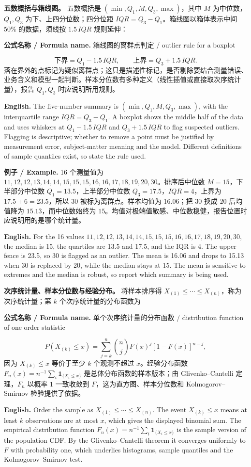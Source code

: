 \documentclass[UTF8,11pt,a4paper]{ctexart}
\newcommand{\EN}[1]{\par\noindent\textbf{English.} #1\par}
\newcommand{\FORMULA}[2]{\par\noindent\textbf{公式名称 / Formula name.} #1 / #2\par}
\newcommand{\EX}[2]{\par\noindent\textbf{例子 / Example.} #1\par\EN{#2}}
\begin{document}
\noindent\textbf{五数概括与箱线图。} 五数概括是 $(\min,Q_1,M,Q_3,\max)$，其中 $M$ 为中位数，$Q_1,Q_3$ 为下、上四分位数；四分位距 $IQR=Q_3-Q_1$。箱线图以箱体表示中间 $50\%$ 的数据，须线按 $1.5\,IQR$ 规则延伸：
\FORMULA{箱线图的离群点判定}{outlier rule for a boxplot}
\[
\text{下界}=Q_1-1.5\,IQR,\qquad \text{上界}=Q_3+1.5\,IQR.
\]
落在界外的点标记为疑似离群点；这只是描述性标记，是否剔除要结合测量错误、业务含义和模型一起判断。样本分位数有多种定义（线性插值或直接取次序统计量），报告 $Q_1,Q_3$ 时应说明所用规则。
\EN{The five-number summary is $(\min,Q_1,M,Q_3,\max)$, with the interquartile range $IQR=Q_3-Q_1$. A boxplot shows the middle half of the data and uses whiskers at $Q_1-1.5\,IQR$ and $Q_3+1.5\,IQR$ to flag suspected outliers. Flagging is descriptive; whether to remove a point must be justified by measurement error, subject-matter meaning and the model. Different definitions of sample quantiles exist, so state the rule used.}

\EX{16 个测量值为 $11,12,12,13,14,14,15,15,15,16,16,17,18,19,20,30$。排序后中位数 $M=15$，下半部分中位数 $Q_1=13.5$，上半部分中位数 $Q_3=17.5$，$IQR=4$，上界为 $17.5+6=23.5$，所以 $30$ 被标为离群点。样本均值为 $16.06$；把 $30$ 换成 $20$ 后均值降为 $15.13$，而中位数始终为 $15$。均值对极端值敏感、中位数稳健，报告位置时应说明用的是哪个统计量。}{For the 16 values $11,12,12,13,14,14,15,15,15,16,16,17,18,19,20,30$, the median is 15, the quartiles are 13.5 and 17.5, and the IQR is 4. The upper fence is 23.5, so 30 is flagged as an outlier. The mean is 16.06 and drops to 15.13 when 30 is replaced by 20, while the median stays at 15. The mean is sensitive to extremes and the median is robust, so report which summary is being used.}

\noindent\textbf{次序统计量、样本分位数与经验分布。} 将样本排序得 $X_{(1)}\le\cdots\le X_{(n)}$，称为次序统计量；第 $k$ 个次序统计量的分布函数为
\FORMULA{单个次序统计量的分布函数}{distribution function of one order statistic}
\[
P(X_{(k)}\le x)=\sum_{j=k}^n\binom njF(x)^j[1-F(x)]^{n-j},
\]
因为 $X_{(k)}\le x$ 等价于至少 $k$ 个观测不超过 $x$。经验分布函数 $F_n(x)=n^{-1}\sum_i\mathbf 1_{\{X_i\le x\}}$ 是总体分布函数的样本版本；由 Glivenko--Cantelli 定理，$F_n$ 以概率 $1$ 一致收敛到 $F$，这为直方图、样本分位数和 Kolmogorov--Smirnov 检验提供了依据。
\EN{Order the sample as $X_{(1)}\le\cdots\le X_{(n)}$. The event $X_{(k)}\le x$ means at least $k$ observations are at most $x$, which gives the displayed binomial sum. The empirical distribution function $F_n(x)=n^{-1}\sum_i\mathbf 1_{\{X_i\le x\}}$ is the sample version of the population CDF. By the Glivenko--Cantelli theorem it converges uniformly to $F$ with probability one, which underlies histograms, sample quantiles and the Kolmogorov--Smirnov test.}
\end{document}
